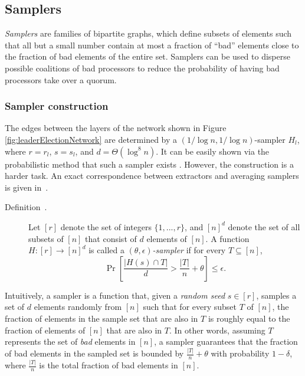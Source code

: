 \documentclass[11pt]{article}
\theoremstyle{plain}
\begin{document}
\subsection{Samplers}

\emph{Samplers} are families of bipartite graphs, which define subsets
of elements such that all but a small number contain at most a fraction
of ``bad'' elements close to the fraction of bad elements of the
entire set. Samplers can be used to disperse possible coalitions of
bad processors to reduce the probability of having bad processors
take over a quorum.%

\subsubsection{Sampler construction}

The edges between the layers of the network shown in Figure \ref{fig:leaderElectionNetwork}
are determined by a $(1/\log{n},1/\log{n})$-sampler $H_{l}$, where
$r=r_{l}$, $s=s_{l}$, and $d=\Theta(\log^{8}{n})$. It can be easily
shown via the probabilistic method that such a sampler exists \cite{King:2006:SLE:1109557.1109667}.
However, the construction is a harder task. An exact correspondence
between extractors and averaging samplers is given in~\cite{zuckerman-sampling}.

\begin{description}
	\item [{Definition~\cite{Gradwohl}.}] Let $[r]$ denote the set of integers
	$\{1,...,r\}$, and $[n]^{d}$ denote the set of all subsets of $[n]$
	that consist of $d$ elements of $[n]$. A function $H:[r]\to[n]^{d}$
	is called a \emph{$(\theta,\epsilon)$-sampler} if for every $T\subseteq[n]$,
	\[
	\Pr\left[\frac{|H(s)\cap T|}{d}>\frac{|T|}{n}+\theta\right]\leq\epsilon.
	\]
\end{description}
Intuitively, a sampler is a function that, given a \emph{random seed}
$s\in[r]$, samples a set of $d$ elements randomly from $[n]$ such
that for every subset $T$ of $[n]$, the fraction of elements in
the sample set that are also in $T$ is roughly equal to the fraction
of elements of $[n]$ that are also in $T$. In other words, assuming
$T$ represents the set of \emph{bad} elements in $[n]$, a sampler
guarantees that the fraction of bad elements in the sampled set is
bounded by $\frac{|T|}{n}+\theta$ with probability $1-\delta$, where
$\frac{|T|}{n}$ is the total fraction of bad elements in $[n]$.
\end{document}
